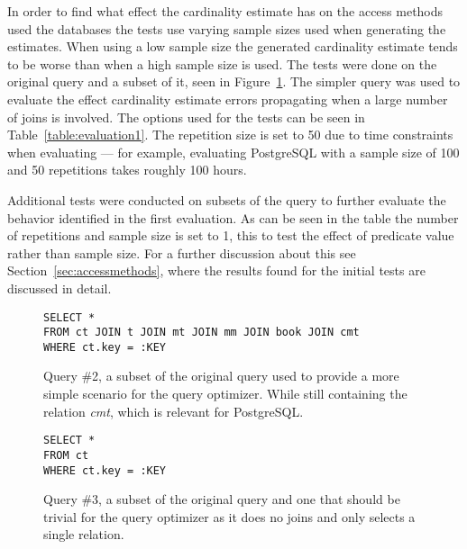 In order to find what effect the cardinality estimate has on the access methods
used the databases the tests use varying sample sizes used when generating the
estimates. When using a low sample size the generated cardinality estimate tends
to be worse than when a high sample size is used. The tests were done on the
original query and a subset of it, seen in Figure~\ref{fig:sql:query2}. The
simpler query was used to evaluate the effect cardinality estimate errors
propagating when a large number of joins is involved. The options used for the
tests can be seen in Table~\ref{table:evaluation1}. The repetition size is set
to 50 due to time constraints when evaluating --- for example, evaluating
PostgreSQL with a sample size of 100 and 50 repetitions takes roughly 100 hours.

Additional tests were conducted on subsets of the query to further evaluate the
behavior identified in the first evaluation. As can be seen in the table the
number of repetitions and sample size is set to 1, this to test the effect of
predicate value rather than sample size. For a further discussion about this see
Section~\ref{sec:accessmethods}, where the results found for the initial tests
are discussed in detail.

\begin{figure}[ht]
\begin{verbatim}
SELECT *
FROM ct JOIN t JOIN mt JOIN mm JOIN book JOIN cmt
WHERE ct.key = :KEY
\end{verbatim}
  \caption[Query \#2, used for the second evaluation]{Query \#2, a subset of the
  original query used to provide a more simple scenario for the query optimizer.
  While still containing the relation \textit{cmt}, which is relevant for
  PostgreSQL.}\label{fig:sql:query2}
\end{figure}

\begin{figure}[ht]
\begin{verbatim}
SELECT *
FROM ct
WHERE ct.key = :KEY
\end{verbatim}
  \caption[Query \#3, used for the second evaluation]{Query \#3, a subset of the
  original query and one that should be trivial for the query optimizer as it
  does no joins and only selects a single relation.}\label{fig:sql:query3}
\end{figure}

